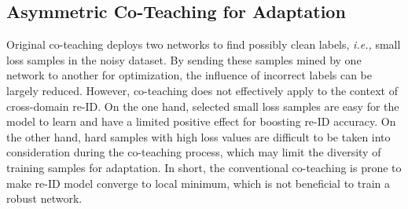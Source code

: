 \documentclass[letterpaper]{article} \usepackage{aaai20}  \usepackage{times}  \usepackage{helvet} \usepackage{courier}  \usepackage[hyphens]{url}  \usepackage{graphicx} \urlstyle{rm} \def\UrlFont{\rm}  \usepackage{graphicx}  \frenchspacing  \setlength{\pdfpagewidth}{8.5in}  \setlength{\pdfpageheight}{11in}  \usepackage{color}
\begin{document}
\subsection{Asymmetric Co-Teaching for Adaptation} 
\label{sec:ACT}
Original co-teaching \cite{han2018co} deploys two networks to find possibly clean labels, \textit{i.e.,} small loss samples in the noisy dataset. By sending these samples mined by one network to another for optimization, the influence of incorrect labels can be largely reduced. 
However, co-teaching does not effectively apply to the context of cross-domain re-ID. On the one hand, selected small loss samples are easy for the model to learn and have a limited positive effect for boosting re-ID accuracy. On the other hand, hard samples with high loss values are difficult to be taken into consideration during the co-teaching process, which may limit the diversity of training samples for adaptation. In short, the conventional co-teaching is prone to make re-ID model converge to local minimum, which is not beneficial to train a robust network.
\end{document}
